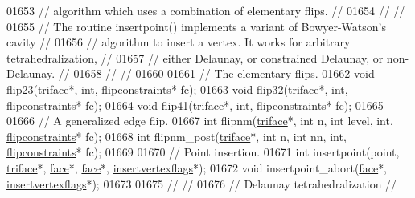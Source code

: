 \begin{DoxyCode}
01653 \textcolor{comment}{// algorithm which uses a combination of elementary flips.                   //}
01654 \textcolor{comment}{//                                                                           //}
01655 \textcolor{comment}{// The routine insertpoint() implements a variant of Bowyer-Watson's cavity  //}
01656 \textcolor{comment}{// algorithm to insert a vertex. It works for arbitrary tetrahedralization,  //}
01657 \textcolor{comment}{// either Delaunay, or constrained Delaunay, or non-Delaunay.                //}
01658 \textcolor{comment}{//                                                                           //}
01660 \textcolor{comment}{}
01661   \textcolor{comment}{// The elementary flips.}
01662   \textcolor{keywordtype}{void} flip23(\hyperlink{classtetgenmesh_1_1triface}{triface}*, \textcolor{keywordtype}{int}, \hyperlink{classtetgenmesh_1_1flipconstraints}{flipconstraints}* fc);
01663   \textcolor{keywordtype}{void} flip32(\hyperlink{classtetgenmesh_1_1triface}{triface}*, \textcolor{keywordtype}{int}, \hyperlink{classtetgenmesh_1_1flipconstraints}{flipconstraints}* fc);
01664   \textcolor{keywordtype}{void} flip41(\hyperlink{classtetgenmesh_1_1triface}{triface}*, \textcolor{keywordtype}{int}, \hyperlink{classtetgenmesh_1_1flipconstraints}{flipconstraints}* fc);
01665 
01666   \textcolor{comment}{// A generalized edge flip.}
01667   \textcolor{keywordtype}{int} flipnm(\hyperlink{classtetgenmesh_1_1triface}{triface}*, \textcolor{keywordtype}{int} n, \textcolor{keywordtype}{int} level, \textcolor{keywordtype}{int}, \hyperlink{classtetgenmesh_1_1flipconstraints}{flipconstraints}* fc);
01668   \textcolor{keywordtype}{int} flipnm\_post(\hyperlink{classtetgenmesh_1_1triface}{triface}*, \textcolor{keywordtype}{int} n, \textcolor{keywordtype}{int} nn, \textcolor{keywordtype}{int}, \hyperlink{classtetgenmesh_1_1flipconstraints}{flipconstraints}* fc);
01669 
01670   \textcolor{comment}{// Point insertion.}
01671   \textcolor{keywordtype}{int}  insertpoint(point, \hyperlink{classtetgenmesh_1_1triface}{triface}*, \hyperlink{classtetgenmesh_1_1face}{face}*, \hyperlink{classtetgenmesh_1_1face}{face}*, 
      \hyperlink{classtetgenmesh_1_1insertvertexflags}{insertvertexflags}*);
01672   \textcolor{keywordtype}{void} insertpoint\_abort(\hyperlink{classtetgenmesh_1_1face}{face}*, \hyperlink{classtetgenmesh_1_1insertvertexflags}{insertvertexflags}*);
01673 
01675 \textcolor{comment}{//                                                                           //}
01676 \textcolor{comment}{// Delaunay tetrahedralization                                               //}

\end{DoxyCode}
